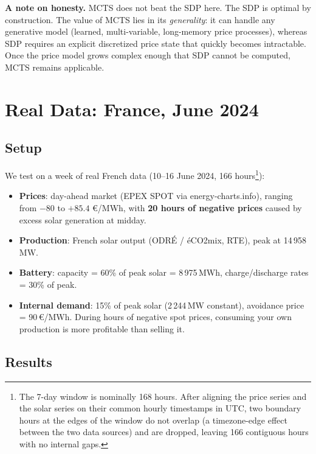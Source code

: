 \documentclass[12pt,a4paper]{article}
\begin{document}
\textbf{A note on honesty.} MCTS does not beat the SDP here. The SDP is
optimal by construction. The value of MCTS lies in its \emph{generality}: it
can handle any generative model (learned, multi-variable, long-memory price
processes), whereas SDP requires an explicit discretized price state that
quickly becomes intractable. Once the price model grows complex enough that
SDP cannot be computed, MCTS remains applicable.

\section{Real Data: France, June 2024}

\subsection{Setup}

We test on a week of real French data (10--16 June 2024, 166
hours\footnote{The 7-day window is nominally 168 hours. After aligning the
price series and the solar series on their common hourly timestamps in UTC,
two boundary hours at the edges of the window do not overlap (a timezone-edge
effect between the two data sources) and are dropped, leaving 166 contiguous
hours with no internal gaps.}):
\begin{itemize}
  \item \textbf{Prices}: day-ahead market (EPEX SPOT via energy-charts.info),
    ranging from $-80$ to $+85.4$ \euro/MWh, with \textbf{20 hours of negative
    prices} caused by excess solar generation at midday.
  \item \textbf{Production}: French solar output (ODRÉ / éCO2mix, RTE), peak
    at 14\,958\,MW.
  \item \textbf{Battery}: capacity = 60\% of peak solar = 8\,975\,MWh,
    charge/discharge rates = 30\% of peak.
  \item \textbf{Internal demand}: 15\% of peak solar (2\,244\,MW constant),
    avoidance price = 90\,\euro/MWh. During hours of negative spot prices,
    consuming your own production is more profitable than selling it.
\end{itemize}

\subsection{Results}
\end{document}
